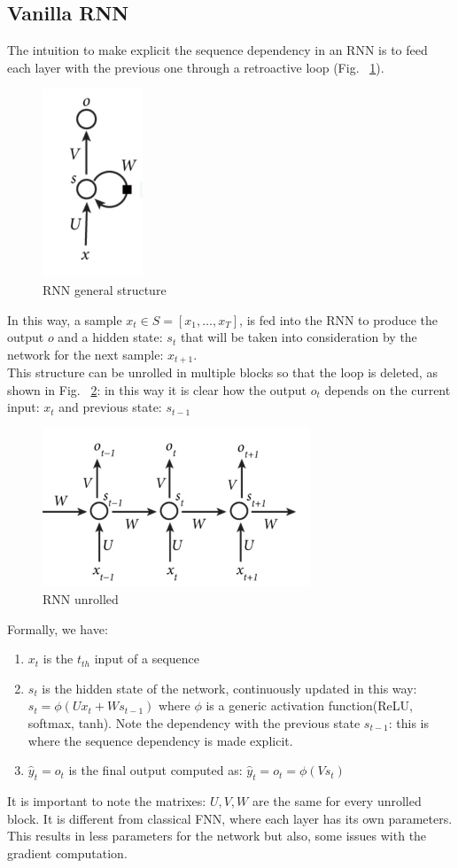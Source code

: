 \documentclass[LaM,binding=0.6cm]{sapthesis}
\begin{document}
\subsection{Vanilla RNN}
The intuition to make explicit the sequence dependency in an RNN is to feed each layer with the previous one through a retroactive loop (Fig. ~\ref{fig:rnnmod}).
\begin{figure}[H]  \centering
    \includegraphics[width=30mm,scale=0.3]{rnnmod}
    \caption{RNN general structure \cite{recsite}}
    \label{fig:rnnmod}
\end{figure}
In this way, a sample $x_t \in S=[x_1,\dots,x_T]$, is fed into the RNN to produce the output $o$ and a hidden state: $s_t$ that will be taken into consideration by the network for the next sample: $x_{t+1}$.\\This structure can be unrolled in multiple blocks so that the loop is deleted, as shown in Fig. ~\ref{fig:unrolled}: in this way it is clear how the output $o_t$ depends on the current input: $x_t$ and previous state: $s_{t-1}$
\begin{figure}[H]  \centering
    \includegraphics[width=80mm,scale=0.7]{unrolled}
    \caption{RNN unrolled \cite{recsite}}
    \label{fig:unrolled}
\end{figure}
Formally, we have:
\begin{enumerate}
\item $x_t$ is the $t_{th}$ input of a sequence
\item $s_t$ is the hidden state of the network, continuously updated in this way: $s_t = \phi\left(Ux_t + Ws_{t-1}\right)$ where $\phi$ is a generic activation function(ReLU, softmax, tanh). Note the dependency with the previous state $s_{t-1}$: this is where the sequence dependency is made explicit.
\item $\hat{y}_t=o_t$ is the final output computed as: $\hat{y}_t=o_t=\phi(Vs_t)$
\end{enumerate}
It is important to note the matrixes: $U,V,W$ are the same for every unrolled block. It is different from classical FNN, where each layer has its own  parameters. This results in less parameters for the network but also, some issues with the gradient computation.
\end{document}
